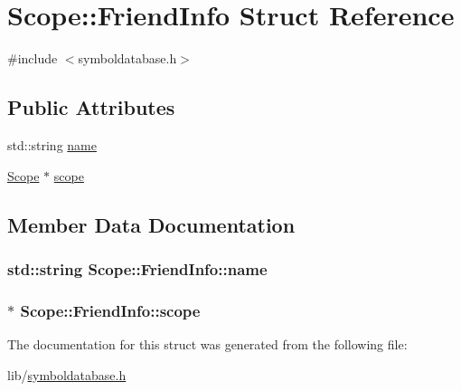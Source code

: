 \hypertarget{struct_scope_1_1_friend_info}{\section{Scope\-:\-:Friend\-Info Struct Reference}
\label{struct_scope_1_1_friend_info}
}


{\ttfamily \#include $<$symboldatabase.\-h$>$}

\subsection*{Public Attributes}
\begin{DoxyCompactItemize}
\item 
std\-::string \hyperlink{struct_scope_1_1_friend_info_abe358bdff67bcac91fd943224738270d}{name}
\item 
\hyperlink{class_scope}{Scope} $\ast$ \hyperlink{struct_scope_1_1_friend_info_a09c017de57a31fe85913fa20fec84d45}{scope}
\end{DoxyCompactItemize}


\subsection{Member Data Documentation}
\hypertarget{struct_scope_1_1_friend_info_abe358bdff67bcac91fd943224738270d}{
\subsubsection[{name}]{\setlength{\rightskip}{0pt plus 5cm}std\-::string Scope\-::\-Friend\-Info\-::name}}\label{struct_scope_1_1_friend_info_abe358bdff67bcac91fd943224738270d}
\hypertarget{struct_scope_1_1_friend_info_a09c017de57a31fe85913fa20fec84d45}{
\subsubsection[{scope}]{$\ast$ Scope\-::\-Friend\-Info\-::scope}}\label{struct_scope_1_1_friend_info_a09c017de57a31fe85913fa20fec84d45}


The documentation for this struct was generated from the following file\-:\begin{DoxyCompactItemize}
\item 
lib/\hyperlink{symboldatabase_8h}{symboldatabase.\-h}\end{DoxyCompactItemize}
